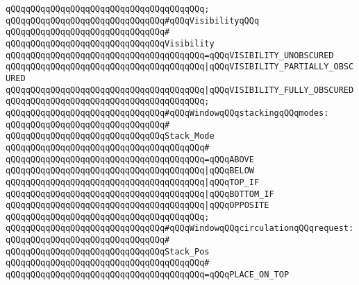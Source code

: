\verb|qQQqqQQqqQQqqQQqqQQqqQQqqQQqqQQqqQQqqQQq;|\newline
\newline
\verb|qQQqqQQqqQQqqQQqqQQqqQQqqQQqqQQq#qQQqVisibilityqQQq|\newline
\verb|qQQqqQQqqQQqqQQqqQQqqQQqqQQqqQQq#|\newline
\verb|qQQqqQQqqQQqqQQqqQQqqQQqqQQqqQQqVisibility|\newline
\verb|qQQqqQQqqQQqqQQqqQQqqQQqqQQqqQQqqQQqqQQq=qQQqVISIBILITY_UNOBSCURED|\newline
\verb|qQQqqQQqqQQqqQQqqQQqqQQqqQQqqQQqqQQqqQQq|\verb#|qQQqVISIBILITY_PARTIALLY_OBSCURED#\newline
\verb|qQQqqQQqqQQqqQQqqQQqqQQqqQQqqQQqqQQqqQQq|\verb#|qQQqVISIBILITY_FULLY_OBSCURED#\newline
\verb|qQQqqQQqqQQqqQQqqQQqqQQqqQQqqQQqqQQqqQQq;|\newline
\newline
\verb|qQQqqQQqqQQqqQQqqQQqqQQqqQQqqQQq#qQQqWindowqQQqstackingqQQqmodes:|\newline
\verb|qQQqqQQqqQQqqQQqqQQqqQQqqQQqqQQq#|\newline
\verb|qQQqqQQqqQQqqQQqqQQqqQQqqQQqqQQqStack_Mode|\newline
\verb|qQQqqQQqqQQqqQQqqQQqqQQqqQQqqQQqqQQqqQQq#|\newline
\verb|qQQqqQQqqQQqqQQqqQQqqQQqqQQqqQQqqQQqqQQq=qQQqABOVE|\newline
\verb|qQQqqQQqqQQqqQQqqQQqqQQqqQQqqQQqqQQqqQQq|\verb#|qQQqBELOW#\newline
\verb|qQQqqQQqqQQqqQQqqQQqqQQqqQQqqQQqqQQqqQQq|\verb#|qQQqTOP_IF#\newline
\verb|qQQqqQQqqQQqqQQqqQQqqQQqqQQqqQQqqQQqqQQq|\verb#|qQQqBOTTOM_IF#\newline
\verb|qQQqqQQqqQQqqQQqqQQqqQQqqQQqqQQqqQQqqQQq|\verb#|qQQqOPPOSITE#\newline
\verb|qQQqqQQqqQQqqQQqqQQqqQQqqQQqqQQqqQQqqQQq;|\newline
\newline
\verb|qQQqqQQqqQQqqQQqqQQqqQQqqQQqqQQq#qQQqWindowqQQqcirculationqQQqrequest:|\newline
\verb|qQQqqQQqqQQqqQQqqQQqqQQqqQQqqQQq#|\newline
\verb|qQQqqQQqqQQqqQQqqQQqqQQqqQQqqQQqStack_Pos|\newline
\verb|qQQqqQQqqQQqqQQqqQQqqQQqqQQqqQQqqQQqqQQq#|\newline
\verb|qQQqqQQqqQQqqQQqqQQqqQQqqQQqqQQqqQQqqQQq=qQQqPLACE_ON_TOP|\newline
